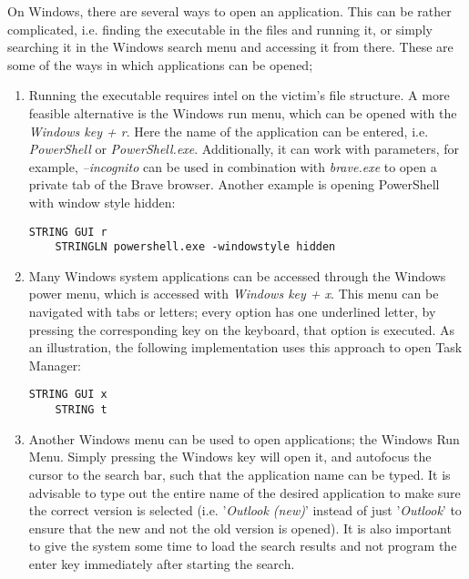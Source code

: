 On Windows, there are several ways to open an application. This can be rather complicated, i.e. finding the executable in the files and running it, or simply searching it in the Windows search menu and accessing it from there. These are some of the ways in which applications can be opened;
\begin{enumerate}
    \item Running the executable requires intel on the victim's file structure. A more feasible alternative is the Windows run menu, which can be opened with the \textit{Windows key + r}. Here the name of the application can be entered, i.e. \textit{PowerShell} or \textit{PowerShell.exe}. Additionally, it can work with parameters, for example, \textit{--incognito} can be used in combination with \textit{brave.exe} to open a private tab of the Brave browser. Another example is opening PowerShell with window style hidden:
    \begin{lstlisting}[caption={Open PowerShell in a hidden window with Windows Run Menu},captionpos=b]
    STRING GUI r
    STRINGLN powershell.exe -windowstyle hidden
    \end{lstlisting}
    \item Many Windows system applications can be accessed through the Windows power menu, which is accessed with \textit{Windows key + x}. This menu can be navigated with tabs or letters; every option has one underlined letter, by pressing the corresponding key on the keyboard, that option is executed. As an illustration, the following implementation uses this approach to open Task Manager:
    \begin{lstlisting}[caption={Open PowerShell with Windows Power User Menu}, captionpos=b]
    STRING GUI x
    STRING t
    \end{lstlisting}
    \item Another Windows menu can be used to open applications; the Windows Run Menu. Simply pressing the Windows key will open it, and autofocus the cursor to the search bar, such that the application name can be typed. It is advisable to type out the entire name of the desired application to make sure the correct version is selected (i.e. '\textit{Outlook (new)}' instead of just '\textit{Outlook}' to ensure that the new and not the old version is opened). It is also important to give the system some time to load the search results and not program the enter key immediately after starting the search.
    \begin{lstlisting}[caption={Open Teams through Windows Run Menu}, captionpos=b]

\end{lstlisting}
\end{enumerate}
